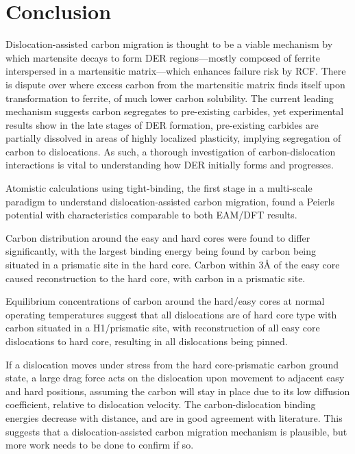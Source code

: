 \documentclass[a4paper,12pt,oneside,print,numbered,index,PageStyleIII]{PhDThesisPSnPDF}
\begin{document}
\section{Conclusion}
\label{sec:orgc39ebc0}

Dislocation-assisted carbon migration is thought to be a viable mechanism by which martensite
decays to form DER regions---mostly composed of ferrite interspersed in a martensitic
matrix---which enhances failure risk by RCF. There is dispute over where excess carbon from the
martensitic matrix finds itself upon transformation to ferrite, of much lower carbon
solubility. The current leading mechanism suggests carbon segregates to pre-existing carbides, yet
experimental results show in the late stages of DER formation, pre-existing carbides are partially
dissolved in areas of highly localized plasticity, implying segregation of carbon to
dislocations. As such, a thorough investigation of carbon-dislocation interactions is vital to
understanding how DER initially forms and progresses.

Atomistic calculations using tight-binding, the first stage in a multi-scale paradigm to
understand dislocation-assisted carbon migration, found a Peierls potential with characteristics
comparable to both EAM/DFT results.

Carbon distribution around the easy and hard cores were found to differ
significantly, with the largest binding energy being found by carbon being situated in a prismatic
site in the hard core. Carbon within 3\AA{} of the easy core caused reconstruction to the hard core,
with carbon in a prismatic site.

Equilibrium concentrations of carbon around the hard/easy cores at normal operating temperatures
suggest that all dislocations are of hard core type with carbon situated in a H1/prismatic site, with
reconstruction of all easy core dislocations to hard core, resulting in all dislocations being
pinned.

If a dislocation moves under stress from the hard core-prismatic carbon ground state, a large drag
force acts on the dislocation upon movement to adjacent easy and hard positions, assuming the carbon
will stay in place due to its low diffusion coefficient, relative to dislocation velocity. The
carbon-dislocation binding energies decrease with distance, and are in good agreement with
literature. This suggests that a dislocation-assisted carbon migration mechanism is plausible, but
more work needs to be done to confirm if so.
\end{document}
